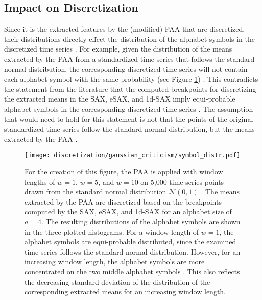 \subsection*{Impact on Discretization}
Since it is the extracted features by the (modified) \ac{PAA} that are discretized, their distributions directly effect the distribution of the alphabet symbols in the discretized time series \cite{SAX_Criticism}. For example, given the distribution of the means extracted by the \ac{PAA} from a standardized time series that follows the standard normal distribution, the corresponding discretized time series will not contain each alphabet symbol with the same probability (see Figure \ref{fig:symbol_distr}) \cite{SAX_Criticism}. This contradicts the statement from the literature that the computed breakpoints for discretizing the extracted means in the \ac{SAX}, \ac{eSAX}, and \ac{1d-SAX} imply equi-probable alphabet symbols in the corresponding discretized time series \cite{SAX_Lin}. The assumption that would need to hold for this statement is not that the points of the original standardized time series follow the standard normal distribution, but the means extracted by the \ac{PAA} \cite{SAX_Criticism}.
\begin{figure}[htb]
\centering
\texttt{[image: discretization/gaussian\_criticism/symbol\_distr.pdf]}
\caption[Distribution of Alphabet Symbols in the Discretized Time Series]{For the creation of this figure, the \ac{PAA} is applied with window lengths of $w = 1$, $w = 5$, and $w = 10$ on 5,000 time series points drawn from the standard normal distribution $\mathcal{N}(0,1)$ \cite{SAX_Criticism}. The means extracted by the \ac{PAA} are discretized based on the breakpoints computed by the \ac{SAX}, \ac{eSAX}, and \ac{1d-SAX} for an alphabet size of $a = 4$. The resulting distributions of the alphabet symbols are shown in the three plotted histograms. For a window length of $w = 1$, the alphabet symbols are equi-probable distributed, since the examined time series follows the standard normal distribution. However, for an increasing window length, the alphabet symbols are more concentrated on the two middle alphabet symbols \cite{SAX_Criticism}. This also reflects the decreasing standard deviation of the distribution of the corresponding extracted means for an increasing window length.}
\label{fig:symbol_distr}
\end{figure}